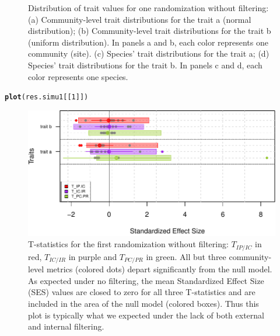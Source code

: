 \documentclass[12pt]{article}\usepackage[]{graphicx}\usepackage[]{color}
\makeatletter
\def\maxwidth{ %
  \ifdim\Gin@nat@width>\linewidth
    \linewidth
  \else
    \Gin@nat@width
  \fi
}
\newcommand{\hlnum}[1]{\textcolor[rgb]{0.686,0.059,0.569}{#1}}%
\newcommand{\hlstd}[1]{\textcolor[rgb]{0.345,0.345,0.345}{#1}}%
\newcommand{\hlkwd}[1]{\textcolor[rgb]{0.737,0.353,0.396}{\textbf{#1}}}%
\newenvironment{kframe}{%
 \def\at@end@of@kframe{}%
 \ifinner\ifhmode%
  \def\at@end@of@kframe{\end{minipage}}%
  \begin{minipage}{\columnwidth}%
 \fi\fi%
 \def\FrameCommand##1{\hskip\@totalleftmargin \hskip-\fboxsep
 \colorbox{shadecolor}{##1}\hskip-\fboxsep
     \hskip-\linewidth \hskip-\@totalleftmargin \hskip\columnwidth}%
 \MakeFramed {\advance\hsize-\width
   \@totalleftmargin\z@ \linewidth\hsize
   \@setminipage}}%
 {\par\unskip\endMakeFramed%
 \at@end@of@kframe}
\newenvironment{knitrout}{}{} %
\makeatother
\begin{document}
\begin{knitrout}
\begin{figure}
{}

\caption[Distribution of trait values for one randomization without filtering]{Distribution of trait values for one randomization without filtering: (a) Community-level trait distributions for the trait a (normal distribution); (b) Community-level trait distributions for the trait b (uniform distribution). In panels a and b, each color represents one community (site). (c) Species' trait distributions for the trait a; (d) Species' trait distributions for the trait b. In panels c and d, each color represents one species.}\label{fig:No_Filter_plots}
\end{figure}


\end{knitrout}

\begin{knitrout}\small
{}\color{fgcolor}\begin{kframe}
\begin{alltt}
\hlkwd{plot}\hlstd{(res.simu1[[}\hlnum{1}\hlstd{]])}
\end{alltt}
\end{kframe}\begin{figure}

{\centering \includegraphics[width=\maxwidth]{figure/No_Filter_plots_Tstats-1} 

}

\caption[T-statistics for the first randomization without filtering]{T-statistics for the first randomization without filtering: $T_{IP/IC}$ in red, $T_{IC/IR}$ in purple and $T_{PC/PR}$ in green. All but three community-level metrics (colored dots) depart significantly from the null model. As expected under no filtering, the mean Standardized Effect Size (SES) values are closed to zero for all three T-statistics and are included in the area of the null model (colored boxes). Thus this plot is typically what we expected under the lack of both external and internal filtering.}\label{fig:No_Filter_plots_Tstats}
\end{figure}


\end{knitrout}
\end{document}
